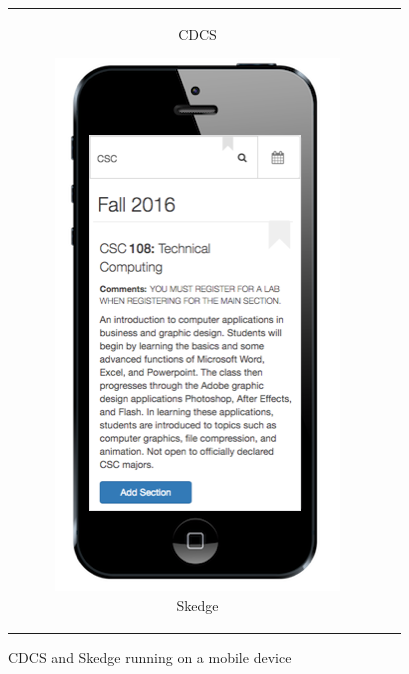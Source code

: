 \begin{figure}[ht]
\begin{tabular}{c c}
\begin{subfigure}[h]{4cm}
      \caption{CDCS} \label{fig:cdcs-mobile}
    \end{subfigure}
    \begin{subfigure}[h]{3.9cm}
      \centering
      \includegraphics[width=1.00\textwidth]{images/skedge/mobile}
      \caption{Skedge} \label{fig:sk-mobile}
    \end{subfigure}
  \end{tabular}
  \caption{CDCS and Skedge running on a mobile device}
\end{figure}

